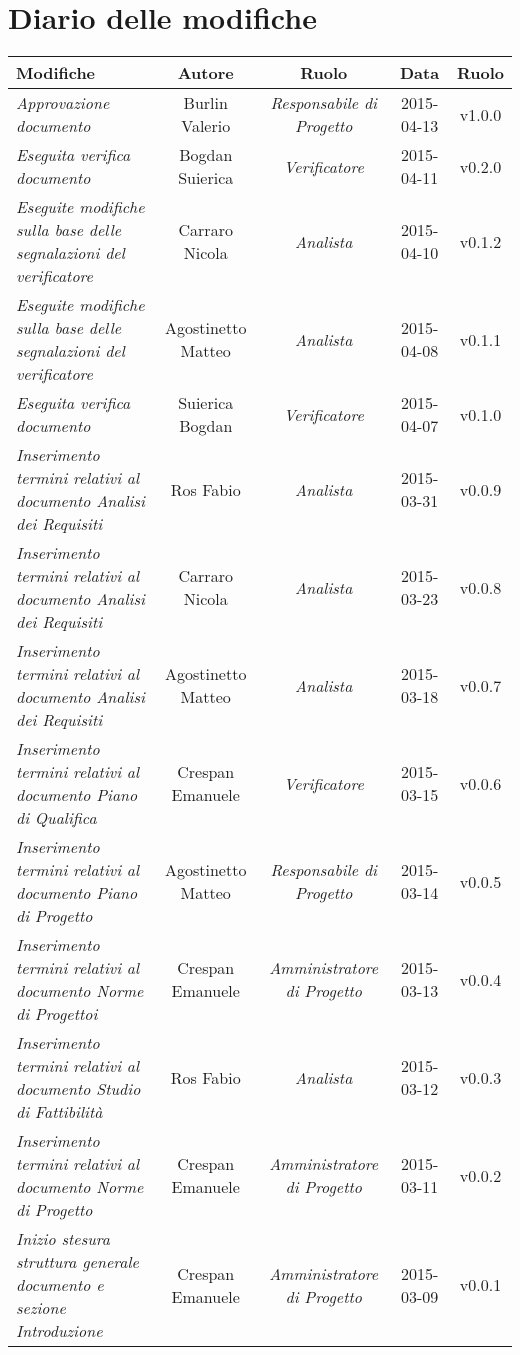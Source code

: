 \newpage
\section*{Diario delle modifiche}

\begin{table}[h]
\centering
\begin{tabular}{|p{}|c|c|c|c|}
	\toprule
		\textbf{Modifiche} & \textbf{Autore} & \textbf{Ruolo} & \textbf{Data} & \textbf{Ruolo} \\
	\midrule
	\midrule
		\textit{Approvazione documento} & Burlin Valerio & \textit{Responsabile di Progetto} & 2015-04-13 & v1.0.0 \\
	\midrule
		\textit{Eseguita verifica documento} & Bogdan Suierica & \textit{Verificatore} & 2015-04-11 & v0.2.0 \\
	\midrule
		\textit{Eseguite modifiche sulla base delle segnalazioni del verificatore} & Carraro Nicola & \textit{Analista} & 2015-04-10 & v0.1.2 \\
    \midrule
	    \textit{Eseguite modifiche sulla base delle segnalazioni del verificatore} & Agostinetto Matteo & \textit{Analista} & 2015-04-08 & v0.1.1 \\
	\midrule
		\textit{Eseguita verifica documento} & Suierica Bogdan & \textit{Verificatore} & 2015-04-07 & v0.1.0 \\
	\midrule
		\textit{Inserimento termini relativi al documento Analisi dei Requisiti} & Ros Fabio & \textit{Analista} & 2015-03-31 & v0.0.9 \\
	\midrule
		\textit{Inserimento termini relativi al documento Analisi dei Requisiti} & Carraro Nicola & \textit{Analista} & 2015-03-23 & v0.0.8 \\
	\midrule
		\textit{Inserimento termini relativi al documento Analisi dei Requisiti} & Agostinetto Matteo & \textit{Analista} & 2015-03-18 & v0.0.7 \\
	\midrule
		\textit{Inserimento termini relativi al documento Piano di Qualifica} & Crespan Emanuele & \textit{Verificatore} & 2015-03-15 & v0.0.6 \\
	\midrule
		\textit{Inserimento termini relativi al documento Piano di Progetto} & Agostinetto Matteo & \textit{Responsabile di Progetto} & 2015-03-14 & v0.0.5 \\
	\midrule
		\textit{Inserimento termini relativi al documento Norme di Progettoi} & Crespan Emanuele & \textit{Amministratore di Progetto} & 2015-03-13 & v0.0.4 \\
	\midrule
	    \textit{Inserimento termini relativi al documento Studio di Fattibilità} & Ros Fabio & \textit{Analista} & 2015-03-12 & v0.0.3 \\
	\midrule
		\textit{Inserimento termini relativi al documento Norme di Progetto} & Crespan Emanuele & \textit{Amministratore di Progetto} & 2015-03-11 & v0.0.2 \\	                         
	\midrule
		\textit{Inizio stesura struttura generale documento e sezione Introduzione} & Crespan Emanuele & \textit{Amministratore di Progetto} & 2015-03-09 & v0.0.1 \\
	\bottomrule
\end{tabular}	
\end{table}

\newpage